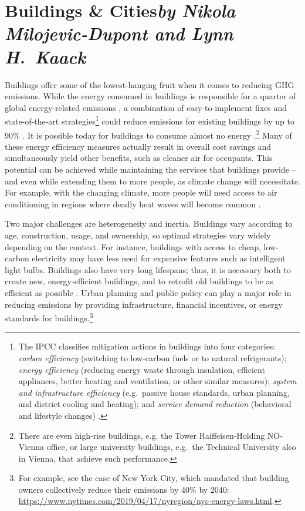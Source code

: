 \documentclass[11pt]{report}
\begin{document}
\section{Buildings \& Cities\texorpdfstring{\hfill\textit{by Nikola Milojevic-Dupont and Lynn H.~Kaack}}{}}
\label{sec:buildings-cities}
Buildings offer some of the lowest-hanging fruit when it comes to reducing GHG emissions. While the energy consumed in buildings is responsible for a quarter of global energy-related emissions \cite{ipcc_global_2018}, a combination of easy-to-implement fixes and state-of-the-art strategies\footnote{The IPCC classifies mitigation actions in buildings into four categories: \textit{carbon efficiency} (switching to low-carbon fuels or to natural refrigerants); \textit{energy efficiency} (reducing energy waste through insulation, efficient appliances, better heating and ventilation, or other similar measures); \textit{system and infrastructure efficiency} (e.g.~passive house standards, urban planning, and district cooling and heating); and \textit{service demand reduction} (behavioral and lifestyle changes) \cite{lucon_buildings_2014}.} could reduce emissions for existing buildings by up to 90\% \cite{urge2013energy}. It is possible today for buildings to consume almost no energy \cite{OLSTHOORN20191382}.\footnote{There are even high-rise buildings, e.g. the Tower Raiffeisen-Holding N\"O-Vienna office, or large university buildings, e.g.~the Technical University also in Vienna, that achieve such performance.} Many of these energy efficiency measures actually result in overall cost savings \cite{STEPHENSON20106120} and simultaneously yield other benefits, such as cleaner air for occupants. This potential can be achieved while maintaining the services that buildings provide -- and even while extending them to more people, as climate change will necessitate. For example, with the changing climate, more people will need access to air conditioning in regions where deadly heat waves will become common \cite{mora2017twenty,mora2017global}. 


Two major challenges are heterogeneity and inertia. Buildings vary according to age, construction, usage, and ownership, so optimal strategies vary widely depending on the context. For instance, buildings with access to cheap, low-carbon electricity may have less need for expensive features such as intelligent light bulbs. Buildings also have very long lifespans; thus, it is necessary both to create new, energy-efficient buildings, and to retrofit old buildings to be as efficient as possible \cite{creutzig_urban_2016}. Urban planning and public policy can play a major role in reducing emissions by providing infrastructure, financial incentives, or energy standards for buildings.\footnote{For example, see the case of New York City, which mandated that building owners collectively reduce their emissions by 40\% by 2040: \url{https://www.nytimes.com/2019/04/17/nyregion/nyc-energy-laws.html}.}
\end{document}
